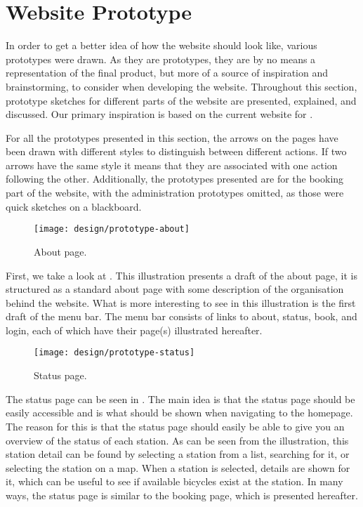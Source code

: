 \section{Website Prototype}\label{sec:prototype}
In order to get a better idea of how the website should look like, various prototypes were drawn.
As they are prototypes, they are by no means a representation of the final product, but more of a source of inspiration and brainstorming, to consider when developing the website.
Throughout this section, prototype sketches for different parts of the website are presented, explained, and discussed.
Our primary inspiration is based on the current website for \bycykel \citep{misc:aalborgbycykelMain}.

For all the prototypes presented in this section, the arrows on the pages have been drawn with different styles to distinguish between different actions. 
If two arrows have the same style it means that they are associated with one action following the other.
Additionally, the prototypes presented are for the booking part of the website, with the administration prototypes omitted, as those were quick sketches on a blackboard.

\begin{figure}[h]
	\centering
	\texttt{[image: design/prototype-about]}
	\caption{About page.}\label{fig:prototype-about}
\end{figure}

 
First, we take a look at .
This illustration presents a draft of the about page, it is structured as a standard about page with some description of the organisation behind the website.
What is more interesting to see in this illustration is the first draft of the menu bar.
The menu bar consists of links to about, status, book, and login, each of which have their page(s) illustrated hereafter.

\begin{figure}[h]
	\centering
	\texttt{[image: design/prototype-status]}
	\caption{Status page.}\label{fig:prototype-status}
\end{figure}

The status page can be seen in .
The main idea is that the status page should be easily accessible and is what should be shown when navigating to the homepage.
The reason for this is that the status page should easily be able to give you an overview of the status of each station.
As can be seen from the illustration, this station detail can be found by selecting a station from a list, searching for it, or selecting the station on a map.
When a station is selected, details are shown for it, which can be useful to see if available bicycles exist at the station.
In many ways, the status page is similar to the booking page, which is presented hereafter.

